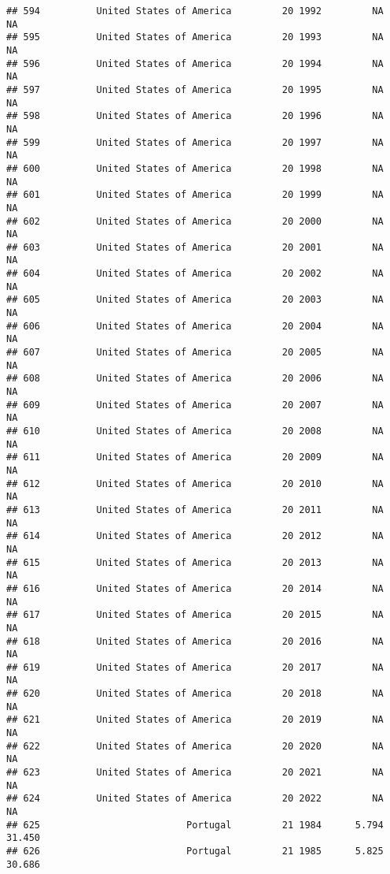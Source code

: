 \documentclass[
]{article}
\begin{document}
\begin{verbatim}
## 594          United States of America         20 1992         NA         NA
## 595          United States of America         20 1993         NA         NA
## 596          United States of America         20 1994         NA         NA
## 597          United States of America         20 1995         NA         NA
## 598          United States of America         20 1996         NA         NA
## 599          United States of America         20 1997         NA         NA
## 600          United States of America         20 1998         NA         NA
## 601          United States of America         20 1999         NA         NA
## 602          United States of America         20 2000         NA         NA
## 603          United States of America         20 2001         NA         NA
## 604          United States of America         20 2002         NA         NA
## 605          United States of America         20 2003         NA         NA
## 606          United States of America         20 2004         NA         NA
## 607          United States of America         20 2005         NA         NA
## 608          United States of America         20 2006         NA         NA
## 609          United States of America         20 2007         NA         NA
## 610          United States of America         20 2008         NA         NA
## 611          United States of America         20 2009         NA         NA
## 612          United States of America         20 2010         NA         NA
## 613          United States of America         20 2011         NA         NA
## 614          United States of America         20 2012         NA         NA
## 615          United States of America         20 2013         NA         NA
## 616          United States of America         20 2014         NA         NA
## 617          United States of America         20 2015         NA         NA
## 618          United States of America         20 2016         NA         NA
## 619          United States of America         20 2017         NA         NA
## 620          United States of America         20 2018         NA         NA
## 621          United States of America         20 2019         NA         NA
## 622          United States of America         20 2020         NA         NA
## 623          United States of America         20 2021         NA         NA
## 624          United States of America         20 2022         NA         NA
## 625                          Portugal         21 1984      5.794     31.450
## 626                          Portugal         21 1985      5.825     30.686

\end{verbatim}
\end{document}
